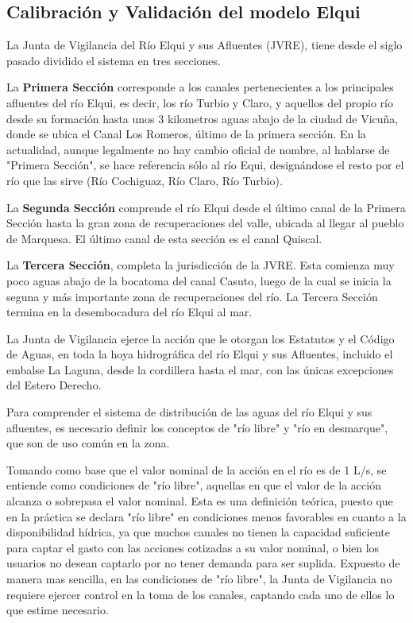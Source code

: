 \documentclass[10pt,]{article}
\begin{document}
		\subsection{Calibración y Validación del modelo Elqui}
		

La Junta de Vigilancia del Río Elqui y sus Afluentes (JVRE), tiene desde el siglo pasado dividido el sistema en tres secciones.\bigskip

La \textbf {Primera Sección} corresponde a los canales pertenecientes a los principales afluentes del río Elqui, es decir, los río Turbio y Claro, y aquellos del propio río desde su formación hasta unos 3 kilometros aguas abajo de la ciudad de Vicuña, donde se ubica el Canal Los Romeros, último de la primera sección. En la actualidad, aunque legalmente no hay cambio oficial de nombre, al hablarse de "Primera Sección", se hace referencia sólo al río Equi, designándose el resto por el río que las sirve (Río Cochiguaz, Río Claro, Río Turbio).\bigskip

La \textbf {Segunda Sección} comprende el río Elqui desde el último canal de la Primera Sección hasta la gran zona de recuperaciones del valle, ubicada al llegar al pueblo de Marquesa. El último canal de esta sección es el canal Quiscal.\bigskip

La \textbf {Tercera Sección}, completa la jurisdicción de la JVRE. Esta comienza muy poco aguas abajo de la bocatoma del canal Casuto, luego de la cual se inicia la seguna y más importante zona de recuperaciones del río. La Tercera Sección termina en la desembocadura del río Elqui al mar.\bigskip

La Junta de Vigilancia ejerce la acción que le otorgan los Estatutos y el Código de Aguas, en toda la hoya hidrográfica del río Elqui y sus Afluentes, incluido el embalse La Laguna, desde la cordillera hasta el mar, con las únicas excepciones del Estero Derecho.\bigskip

Para comprender el sistema de distribución de las aguas del río Elqui y sus afluentes, es necesario definir los conceptos de "río libre" y "río en desmarque", que son de uso común en la zona.\bigskip

Tomando como base que el valor nominal de la acción en el río es de 1 L/s, se entiende como condiciones de "río libre", aquellas en que el valor de la acción alcanza o sobrepasa el valor nominal. Esta es una definición teórica, puesto que en la práctica se declara "río libre" en condiciones menos favorables en cuanto a la disponibilidad hídrica, ya que muchos canales no tienen la capacidad suficiente para captar el gasto con las acciones cotizadas a su valor nominal, o bien los usuarios no desean captarlo por no tener demanda para ser suplida. Expuesto de manera mas sencilla, en las condiciones de "río libre", la Junta de Vigilancia no requiere ejercer control en la toma de los canales, captando cada uno de ellos lo que estime necesario.\bigskip
\end{document}
